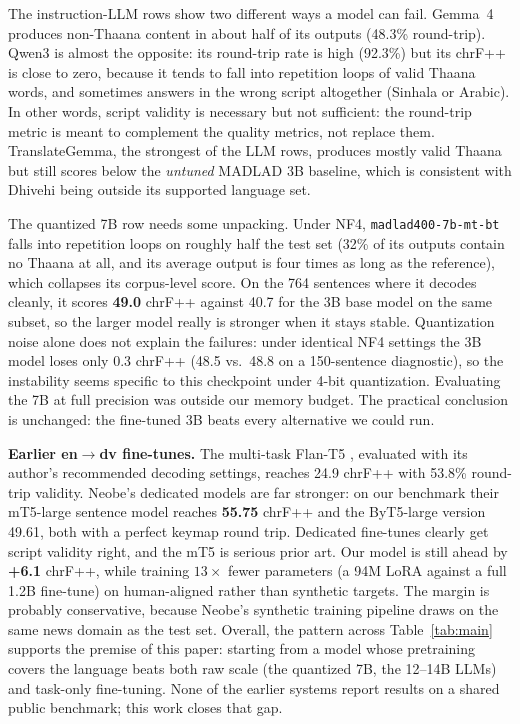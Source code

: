 \documentclass[10pt,twocolumn]{article}
\begin{document}
The instruction-LLM rows show two different ways a model can fail.
Gemma~4 produces non-Thaana content in about half of its outputs (48.3\%
round-trip). Qwen3 is almost the opposite: its round-trip rate is high
(92.3\%) but its chrF++ is close to zero, because it tends to fall into
repetition loops of valid Thaana words, and sometimes answers in the wrong
script altogether (Sinhala or Arabic). In other words, script validity is
necessary but not sufficient: the round-trip metric is meant to
complement the quality metrics, not replace them. TranslateGemma, the
strongest of the LLM rows, produces mostly valid Thaana but still scores
below the \emph{untuned} MADLAD 3B baseline, which is consistent with
Dhivehi being outside its supported language set.

The quantized 7B row needs some unpacking. Under NF4,
\texttt{madlad400-7b-mt-bt} falls into repetition loops on roughly half
the test set (32\% of its outputs contain no Thaana at all, and its
average output is four times as long as the reference), which collapses
its corpus-level score. On the 764 sentences where it decodes cleanly,
it scores \textbf{49.0} chrF++ against 40.7 for the 3B base model on
the same subset, so the larger model really is stronger when it
stays stable. Quantization noise alone does not explain the failures:
under identical NF4 settings the 3B model loses only 0.3 chrF++ (48.5
vs.\ 48.8 on a 150-sentence diagnostic), so the instability seems
specific to this checkpoint under 4-bit quantization. Evaluating the 7B
at full precision was outside our memory budget. The practical
conclusion is unchanged: the fine-tuned 3B beats every alternative we
could run.

\textbf{Earlier en$\to$dv fine-tunes.} The multi-task Flan-T5
\citep{flant5endv}, evaluated with its author's recommended decoding
settings, reaches 24.9 chrF++ with 53.8\% round-trip validity. Neobe's
dedicated models \citep{neobeendv} are far stronger: on our benchmark
their mT5-large sentence model reaches \textbf{55.75} chrF++ and the
ByT5-large version 49.61, both with a perfect keymap round trip.
Dedicated fine-tunes clearly get script validity right, and the mT5 is
serious prior art. Our model is still ahead by \textbf{+6.1} chrF++,
while training $13\times$ fewer parameters (a 94M LoRA against a full
1.2B fine-tune) on human-aligned rather than synthetic targets. The
margin is probably conservative, because Neobe's synthetic training
pipeline draws on the same news domain as the test set. Overall, the
pattern across Table~\ref{tab:main} supports the premise of this paper:
starting from a model whose pretraining covers the language beats both
raw scale (the quantized 7B, the 12--14B LLMs) and task-only
fine-tuning. None of the earlier systems report results on a shared
public benchmark; this work closes that gap.
\end{document}
